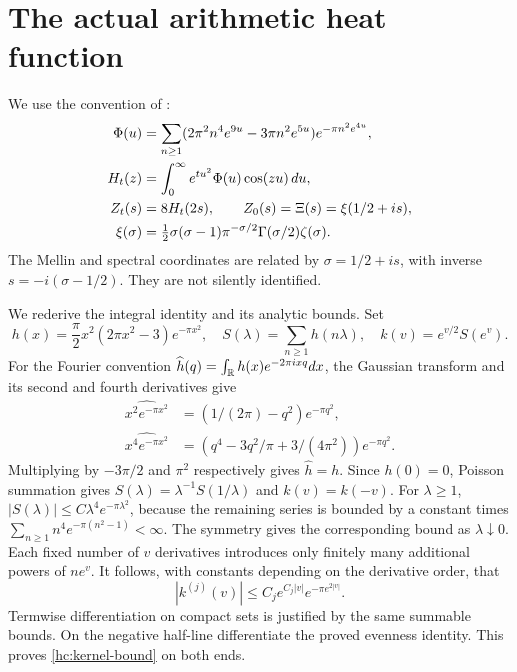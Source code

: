 \section{The actual arithmetic heat function}
We use the convention of \cite[Section 1, equations (1)--(4)]{rodgersTao2020}:
\begin{align}
\Phi(u)&=\sum_{n\ge1}(2\pi^2n^4e^{9u}-3\pi n^2e^{5u})
                       e^{-\pi n^2e^{4u}},\notag\\
H_t(z)&=\int_0^\infty e^{tu^2}\Phi(u)\cos(zu)\,du,\notag\\
Z_t(s)&=8H_t(2s),\qquad
Z_0(s)=\Xi(s)=\xi(1/2+is),\notag\\
\xi(\sigma)&=\tfrac12\sigma(\sigma-1)\pi^{-\sigma/2}
                     \Gamma(\sigma/2)\zeta(\sigma).
\label{hc:Z}
\end{align}
The Mellin and spectral coordinates are related by
$\sigma=1/2+is$, with inverse $s=-i(\sigma-1/2)$.
They are not silently identified.

We rederive the integral identity and its analytic bounds. Set
\[
h(x)=\frac\pi2x^2(2\pi x^2-3)e^{-\pi x^2},\quad
S(\lambda)=\sum_{n\ge1}h(n\lambda),\quad
k(v)=e^{v/2}S(e^v).
\]
For the Fourier convention $\widehat h(q)=\int_\mathbb R h(x)e^{-2\pi ixq}dx$,
the Gaussian transform and its second and fourth derivatives give
\begin{align*}
\widehat{x^2e^{-\pi x^2}}&=(1/(2\pi)-q^2)e^{-\pi q^2},\\
\widehat{x^4e^{-\pi x^2}}&=(q^4-3q^2/\pi+3/(4\pi^2))e^{-\pi q^2}.
\end{align*}
Multiplying by $-3\pi/2$ and $\pi^2$ respectively gives $\widehat h=h$.
Since $h(0)=0$, Poisson summation gives
$S(\lambda)=\lambda^{-1}S(1/\lambda)$ and $k(v)=k(-v)$.
For $\lambda\ge1$,
$|S(\lambda)|\le C\lambda^4e^{-\pi\lambda^2}$, because the
remaining series is bounded by a constant times
$\sum_{n\ge1}n^4e^{-\pi(n^2-1)}<\infty$.
The symmetry gives the corresponding bound as $\lambda\downarrow0$.
Each fixed number of $v$ derivatives introduces only finitely many
additional powers of $ne^v$. It follows, with constants depending
on the derivative order, that
\begin{equation}
|k^{(j)}(v)|\le C_j e^{C_j|v|}e^{-\pi e^{2|v|}}.
\label{hc:kernel-bound}
\end{equation}
Termwise differentiation on compact sets is justified by the same
summable bounds. On the negative half-line differentiate the proved
evenness identity. This proves \eqref{hc:kernel-bound} on both ends.

